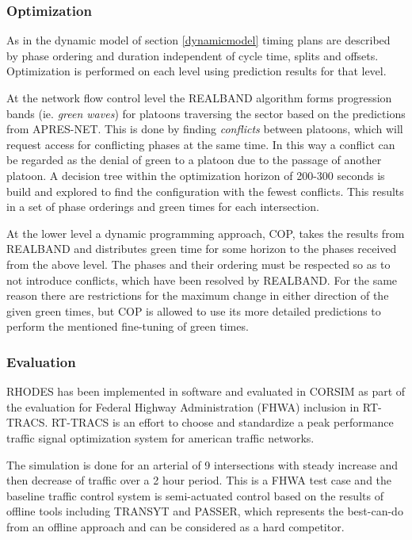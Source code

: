 \subsubsection*{Optimization}
As in the dynamic model of section \ref{dynamicmodel} timing plans are described by phase ordering and duration independent of cycle time, splits and offsets. 
Optimization is performed on each level using prediction results for that level.

At the network flow control level the REALBAND algorithm forms progression bands (ie. \textit{green waves}) for platoons traversing the sector based on the predictions from APRES-NET. This is done by finding \textit{conflicts} between platoons, which will request access for conflicting phases at the same time. In this way a conflict can be regarded as the denial of green to a platoon due to the passage of another platoon. A decision tree within the optimization horizon of 200-300 seconds is build and explored to find the configuration with the fewest conflicts. This results in a set of phase orderings and green times for each intersection.

At the lower level a dynamic programming approach, COP, takes the results from REALBAND and distributes green time for some horizon to the phases received from the above level. The phases and their ordering must be respected so as to not introduce conflicts, which have been resolved by REALBAND. For the same reason there are restrictions for the maximum change in either direction of the given green times, but COP is allowed to use its more detailed predictions to perform the mentioned fine-tuning of green times.

\subsubsection*{Evaluation}
RHODES has been implemented in software and evaluated in CORSIM as part of the evaluation for Federal Highway Administration (FHWA) inclusion in RT-TRACS. RT-TRACS is an effort to choose and standardize a peak performance traffic signal optimization system for american traffic networks.

The simulation is done for an arterial of 9 intersections with steady increase and then decrease of traffic over a 2 hour period. This is a FHWA test case and the baseline traffic control system is semi-actuated control based on the results of offline tools including TRANSYT and PASSER, which represents the best-can-do from an offline approach and can be considered as a hard competitor. 

